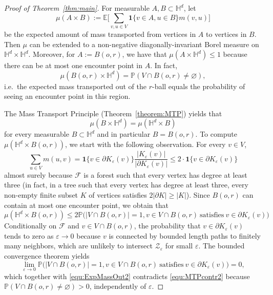 \documentclass[12pt,a4paper]{article}
\theoremstyle{definition}
\begin{document}
\begin{proof}[Proof of Theorem~\ref{thm:main}]
For measurable $A,B\subset\mathbb H^d$, let 
$$
\mu(A\times B):= \mathbb E \bigg[ \sum_{v,u\in V} \mathbf 1\{v\in A, u\in B\} m(v,u) \bigg]
$$
be the expected amount of mass transported from vertices in $A$ to vertices in $B$.
Then $\mu$ can be extended  to a non-negative diagonally-invariant Borel measure on $\mathbb H^d\times \mathbb H^d$. Moreover, for $A:=B(o,r)$, we have that $\mu(A\times\mathbb H^d)\le 1$ because there can be at most one encounter point in $A$. In fact,
\begin{equation} \label{equ:ExpMassOut2}
\mu(B(o,r)\times\mathbb H^d) = \mathbb P( V\cap B(o,r)\ne \varnothing),
\end{equation}
i.e.~the expected mass transported out of the $r$-ball equals the probability of seeing an encounter point in this region.

The Mass Transport Principle (Theorem~\ref{theorem:MTP}) yields that
\begin{equation} \label{equ:MTPcontr2}
\mu(B\times\mathbb H^d)=\mu(\mathbb H^d\times B)
\end{equation}
for every measurable $B\subset\mathbb H^d$ and in particular $B=B(o,r)$. To compute $\mu(\mathbb H^d\times B(o,r))$, we start with the following observation. For every $v\in V$,
$$
\sum_{u\in V} m(u,v) = \mathbf 1\{ v\in \partial K_\varepsilon(v) \}\frac{|K_\varepsilon(v)|}{|\partial K_\varepsilon(v)|} \le 2 \cdot \mathbf 1\{v \in \partial K_\varepsilon (v)\}
$$
almost surely because $\mathcal F$ is a forest such that every vertex has degree at least three (in fact, in a tree such that every vertex has degree at least three, every non-empty finite subset $K$ of vertices satisfies $2|\partial K|\ge |K|$).
Since $B(o,r)$ can contain at most one encounter point, we obtain that
\begin{equation} \label{equ:ExpMassIn}
\mu(\mathbb H^d\times B(o,r)) \le 2 \mathbb P\big( |V\cap B(o,r)| = 1, v\in V\cap B(o,r) \ \mbox{satisfies} \ v\in \partial K_\varepsilon(v)\big) 
\end{equation}
Conditionally on $\mathcal F$ and $v\in V\cap B(o,r)$, the probability that $v\in \partial K_\varepsilon(v)$ tends to zero as $\varepsilon\to0$ because $v$ is connected by bounded length paths to finitely many neighbors, which are unlikely to intersect $\mathcal Z_\varepsilon$ for small $\varepsilon$. The bounded convergence theorem yields
$$
\lim_{\varepsilon\to0} \mathbb P\big( |V\cap B(o,r)| = 1, v\in V\cap B(o,r) \ \mbox{satisfies} \ v\in \partial K_\varepsilon(v)\big) =0,
$$
which together with \eqref{equ:ExpMassOut2} contradicts \eqref{equ:MTPcontr2} because $\mathbb P( V\cap B(o,r)\ne \varnothing)>0$, independently of $\varepsilon$.
\end{proof}
\end{document}
